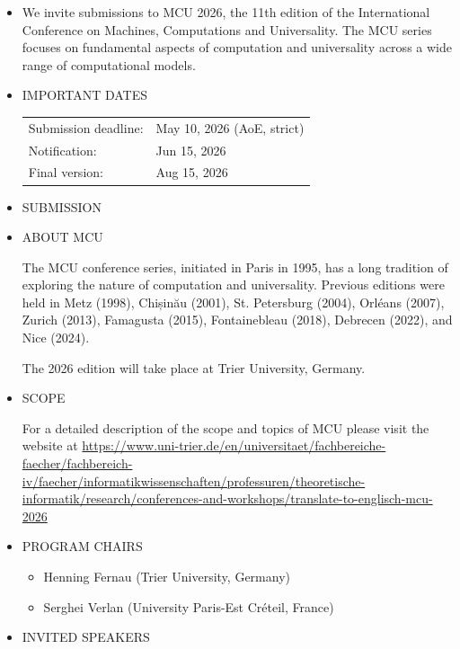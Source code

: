 \documentclass[prodmode,acmtecs]{acmsmall} %
\begin{document}
\begin{itemize}\item  We invite submissions to MCU 2026, the 11th edition of the International Conference on Machines, Computations and Universality. The MCU series focuses on fundamental aspects of computation and universality across a wide range of computational models. 
 
\item  IMPORTANT DATES 
 
\begin{tabulary}{\linewidth}{LL}Submission deadline:  & May 10, 2026 (AoE, strict) \\
Notification:  & Jun 15, 2026 \\
Final version:  & Aug 15, 2026 \\
\end{tabulary}
 
\item  SUBMISSION 
 
\item  ABOUT MCU 
 
  The MCU conference series, initiated in Paris in 1995, has a long tradition of exploring the nature of computation and universality. Previous editions were held in Metz (1998), Chișinău (2001), St. Petersburg (2004), Orléans (2007), Zurich (2013), Famagusta (2015), Fontainebleau (2018), Debrecen (2022), and Nice (2024). 
 
  The 2026 edition will take place at Trier University, Germany. 
 
\item  SCOPE 
 
  For a detailed description of the scope and topics of MCU please visit the website at \href{https://www.uni-trier.de/en/universitaet/fachbereiche-faecher/fachbereich-iv/faecher/informatikwissenschaften/professuren/theoretische-informatik/research/conferences-and-workshops/translate-to-englisch-mcu-2026}{https://www.uni-trier.de/en/universitaet/fachbereiche-faecher/fachbereich-iv/faecher/informatikwissenschaften/professuren/theoretische-informatik/research/conferences-and-workshops/translate-to-englisch-mcu-2026} 
 
\item  PROGRAM CHAIRS 
 
\begin{itemize}\item  Henning Fernau (Trier University, Germany)
\item  Serghei Verlan (University Paris-Est Créteil, France)
\end{itemize} 
\item  INVITED SPEAKERS 
 

\end{itemize}
\end{document}
